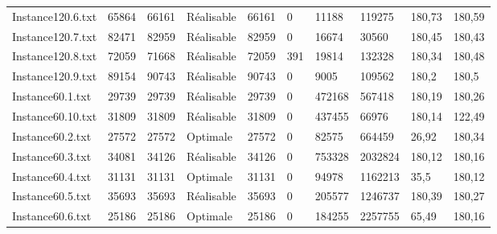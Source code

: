 \documentclass[a4paper,12pt]{article}
\theoremstyle{blueDefinition}
\theoremstyle{redProperty}
\begin{document}
\begin{table}[htbp]
\begin{tabular}{|l|p{40pt}|p{40pt}|p{55pt}|p{45pt}|p{35pt}|p{35pt}|p{35pt}|p{35pt}|p{35pt}|}
Instance120.6.txt  & 65864            & 66161               & Réalisable                & 66161              & 0          & 11188            & 119275               & 180,73           & 180,59               \\
Instance120.7.txt  & 82471            & 82959               & Réalisable                & 82959              & 0          & 16674            & 30560                & 180,45           & 180,43               \\
Instance120.8.txt  & 72059            & 71668               & Réalisable                & 72059              & 391        & 19814            & 132328               & 180,34           & 180,48               \\
Instance120.9.txt  & 89154            & 90743               & Réalisable                & 90743              & 0          & 9005             & 109562               & 180,2            & 180,5                \\
Instance60.1.txt   & 29739            & 29739               & Réalisable                & 29739              & 0          & 472168           & 567418               & 180,19           & 180,26               \\
Instance60.10.txt  & 31809            & 31809               & Réalisable                & 31809              & 0          & 437455           & 66976                & 180,14           & 122,49               \\
Instance60.2.txt   & 27572            & 27572               & Optimale                  & 27572              & 0          & 82575            & 664459               & 26,92            & 180,34               \\
Instance60.3.txt   & 34081            & 34126               & Réalisable                & 34126              & 0          & 753328           & 2032824              & 180,12           & 180,16               \\
Instance60.4.txt   & 31131            & 31131               & Optimale                  & 31131              & 0          & 94978            & 1162213              & 35,5             & 180,12               \\
Instance60.5.txt   & 35693            & 35693               & Réalisable                & 35693              & 0          & 205577           & 1246737              & 180,39           & 180,27               \\
Instance60.6.txt   & 25186            & 25186               & Optimale                  & 25186              & 0          & 184255           & 2257755              & 65,49            & 180,16               \\

\end{tabular}
\end{table}
\end{document}
